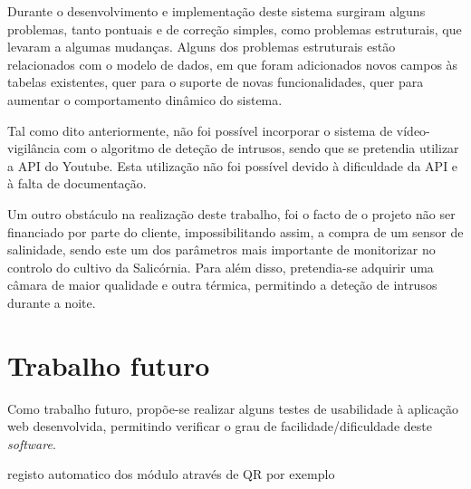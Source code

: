 Durante o desenvolvimento e implementação deste sistema surgiram alguns problemas, tanto pontuais e de correção simples, como
problemas estruturais, que levaram a algumas mudanças. Alguns dos problemas estruturais estão relacionados com o modelo de dados, em que foram adicionados novos campos às tabelas existentes, quer para o suporte de novas funcionalidades, quer para aumentar o comportamento dinâmico do sistema.

Tal como dito anteriormente, não foi possível incorporar o sistema de vídeo-vigilância com o algoritmo de deteção de intrusos, sendo que se pretendia utilizar a \ac{API} do Youtube. Esta utilização não foi possível devido à dificuldade da API e à falta de documentação. 


Um outro obstáculo na realização deste trabalho, foi o facto de o projeto não ser financiado por parte do cliente, impossibilitando assim, a compra de um sensor de salinidade, sendo este um dos parâmetros mais importante de monitorizar no controlo do cultivo da Salicórnia. Para além disso, pretendia-se adquirir uma câmara de maior qualidade e outra térmica, permitindo a deteção de intrusos durante a noite. 










\section{Trabalho futuro}



Como trabalho futuro, propõe-se realizar alguns testes de usabilidade à aplicação web desenvolvida, permitindo verificar o grau de facilidade/dificuldade deste \textit{software}. 





registo automatico dos módulo através de QR por exemplo\\













 
